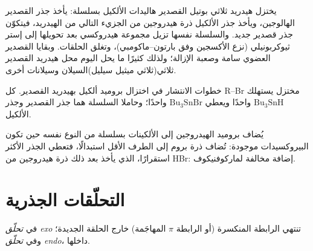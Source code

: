 يختزل هيدريد ثلاثي بوتيل القصدير هاليدات الألكيل بسلسلة: يأخذ جذر القصدير
الهالوجين، ويأخذ جذر الألكيل ذرة هيدروجين من الجزيء التالي من
الهيدريد، فيتكوّن جذر قصدير جديد. والسلسلة نفسها تزيل مجموعة هيدروكسي
بعد تحويلها إلى إستر ثيوكربونيلي (نزع الأكسجين وفق بارتون--ماكومبي)،
وتغلق الحلقات. وبقايا القصدير العضوي سامة وصعبة
الإزالة؛ ولذلك كثيرًا ما يحل اليوم محل هيدريد القصدير ثلاثي(ثلاثي ميثيل سيليل)السيلان وسيلانات
أخرى.

\begin{omfigure}

{\small خطوات الانتشار في اختزال بروميد ألكيل بهيدريد القصدير.
كل R--Br مختزل يستهلك $\mathrm{Bu_3SnH}$ واحدًا ويعطي $\mathrm{Bu_3SnBr}$ واحدًا؛ وحاملا السلسلة
هما جذر القصدير وجذر الألكيل.}
\end{omfigure}

يُضاف بروميد الهيدروجين إلى الألكينات بسلسلة من النوع نفسه حين تكون البيروكسيدات
موجودة: تُضاف ذرة بروم إلى الطرف الأقل استبدالًا، فتعطي الجذر الأكثر
استقرارًا، الذي يأخذ بعد ذلك ذرة هيدروجين من HBr: إضافة مخالفة لماركوفنيكوف.

\section{التحلّقات الجذرية}

\begin{definition}\label{def:b3:radicals-carbenes:cyclisation}
في \emph{تحلّق exo} تنتهي الرابطة المنكسرة (أو
الرابطة $\pi$ المهاجَمة) خارج الحلقة الجديدة؛ وفي \emph{تحلّق
endo}، داخلها.
\end{definition}

